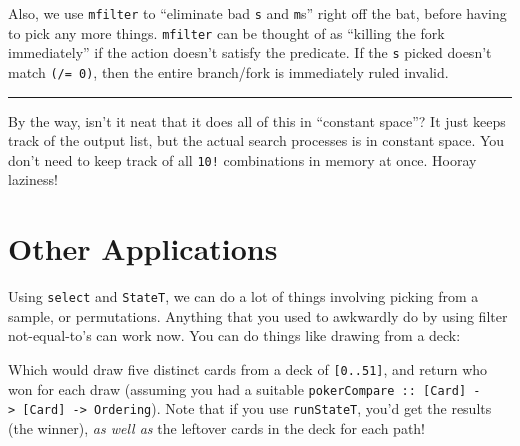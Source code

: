 \documentclass[]{article}
\newenvironment{Shaded}{}{}
\newcommand{\DataTypeTok}[1]{\textcolor[rgb]{0.56,0.13,0.00}{#1}}
\newcommand{\DecValTok}[1]{\textcolor[rgb]{0.25,0.63,0.44}{#1}}
\newcommand{\FunctionTok}[1]{\textcolor[rgb]{0.02,0.16,0.49}{#1}}
\newcommand{\KeywordTok}[1]{\textcolor[rgb]{0.00,0.44,0.13}{\textbf{#1}}}
\newcommand{\NormalTok}[1]{#1}
\newcommand{\OperatorTok}[1]{\textcolor[rgb]{0.40,0.40,0.40}{#1}}
\newcommand{\OtherTok}[1]{\textcolor[rgb]{0.00,0.44,0.13}{#1}}
\begin{document}
Also, we use \texttt{mfilter} to ``eliminate bad \texttt{s} and \texttt{m}s''
right off the bat, before having to pick any more things. \texttt{mfilter} can
be thought of as ``killing the fork immediately'' if the action doesn't satisfy
the predicate. If the \texttt{s} picked doesn't match \texttt{(/=\ 0)}, then the
entire branch/fork is immediately ruled invalid.

\begin{center}\rule{0.5\linewidth}{0.5pt}\end{center}

By the way, isn't it neat that it does all of this in ``constant space''? It
just keeps track of the output list, but the actual search processes is in
constant space. You don't need to keep track of all \texttt{10!} combinations in
memory at once. Hooray laziness!

\section{Other Applications}\label{other-applications}

Using \texttt{select} and \texttt{StateT}, we can do a lot of things involving
picking from a sample, or permutations. Anything that you used to awkwardly do
by using filter not-equal-to's can work now. You can do things like drawing from
a deck:

\begin{Shaded}
\end{Shaded}

Which would draw five distinct cards from a deck of \texttt{{[}0..51{]}}, and
return who won for each draw (assuming you had a suitable
\texttt{pokerCompare\ ::\ {[}Card{]}\ -\textgreater{}\ {[}Card{]}\ -\textgreater{}\ Ordering}).
Note that if you use \texttt{runStateT}, you'd get the results (the winner),
\emph{as well as} the leftover cards in the deck for each path!
\end{document}
